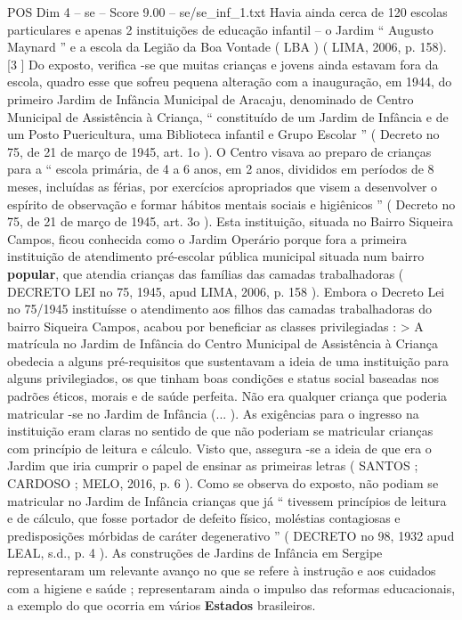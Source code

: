 \begin{textsample}{POS Dim 4 – se – Score 9.00 – se/se\_inf\_1.txt}
Havia ainda cerca de 120 escolas particulares e apenas 2 instituições de educação infantil – o Jardim “ Augusto Maynard ” e a escola da Legião da Boa Vontade ( LBA ) ( LIMA, 2006, p. 158).[3 ] Do exposto, verifica -se que muitas crianças e jovens ainda estavam fora da escola, quadro esse que sofreu pequena alteração com a inauguração, em 1944, do primeiro Jardim de Infância Municipal de Aracaju, denominado de Centro Municipal de Assistência à Criança, “ constituído de um Jardim de Infância e de um Posto Puericultura, uma Biblioteca infantil e Grupo Escolar ” ( Decreto no 75, de 21 de março de 1945, art. 1o ).
O Centro visava ao preparo de crianças para a “ escola primária, de 4 a 6 anos, em 2 anos, divididos em períodos de 8 meses, incluídas as férias, por exercícios apropriados que visem a desenvolver o espírito de observação e formar hábitos mentais sociais e higiênicos ” ( Decreto no 75, de 21 de março de 1945, art. 3o ).
Esta instituição, situada no Bairro Siqueira Campos, ficou conhecida como o Jardim Operário porque fora a primeira instituição de atendimento pré-escolar pública municipal situada num bairro \textbf{popular}, que atendia crianças das famílias das camadas trabalhadoras ( DECRETO LEI no 75, 1945, apud LIMA, 2006, p. 158 ).
Embora o Decreto Lei no 75/1945 instituísse o atendimento aos filhos das camadas trabalhadoras do bairro Siqueira Campos, acabou por beneficiar as classes privilegiadas : > A matrícula no Jardim de Infância do Centro Municipal de Assistência à Criança obedecia a alguns pré-requisitos que sustentavam a ideia de uma instituição para alguns privilegiados, os que tinham boas condições e status social baseadas nos padrões éticos, morais e de saúde perfeita.
Não era qualquer criança que poderia matricular -se no Jardim de Infância (... ).
As exigências para o ingresso na instituição eram claras no sentido de que não poderiam se matricular crianças com princípio de leitura e cálculo.
Visto que, assegura -se a ideia de que era o Jardim que iria cumprir o papel de ensinar as primeiras letras ( SANTOS ; CARDOSO ; MELO, 2016, p. 6 ).
Como se observa do exposto, não podiam se matricular no Jardim de Infância crianças que já “ tivessem princípios de leitura e de cálculo, que fosse portador de defeito físico, moléstias contagiosas e predisposições mórbidas de caráter degenerativo ” ( DECRETO no 98, 1932 apud LEAL, s.d., p. 4 ).
As construções de Jardins de Infância em Sergipe representaram um relevante avanço no que se refere à instrução e aos cuidados com a higiene e saúde ; representaram ainda o impulso das reformas educacionais, a exemplo do que ocorria em vários \textbf{Estados} brasileiros.

\end{textsample}
